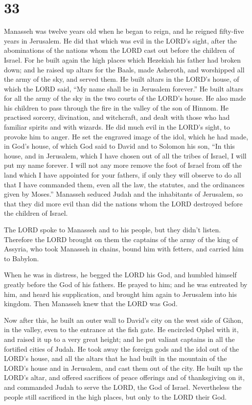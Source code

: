 \hypertarget{section-32}{%
\section{33}\label{section-32}}

 Manasseh was twelve years old when he began to reign, and
he reigned fifty-five years in Jerusalem.  He did that which
was evil in the LORD's sight, after the abominations of the nations whom
the LORD cast out before the children of Israel.  For he
built again the high places which Hezekiah his father had broken down;
and he raised up altars for the Baals, made Asheroth, and worshipped all
the army of the sky, and served them.  He built altars in
the LORD's house, of which the LORD said, ``My name shall be in
Jerusalem forever.''  He built altars for all the army of
the sky in the two courts of the LORD's house.  He also made
his children to pass through the fire in the valley of the son of
Hinnom. He practised sorcery, divination, and witchcraft, and dealt with
those who had familiar spirits and with wizards. He did much evil in the
LORD's sight, to provoke him to anger.  He set the engraved
image of the idol, which he had made, in God's house, of which God said
to David and to Solomon his son, ``In this house, and in Jerusalem,
which I have chosen out of all the tribes of Israel, I will put my name
forever.  I will not any more remove the foot of Israel from
off the land which I have appointed for your fathers, if only they will
observe to do all that I have commanded them, even all the law, the
statutes, and the ordinances given by Moses.''  Manasseh
seduced Judah and the inhabitants of Jerusalem, so that they did more
evil than did the nations whom the LORD destroyed before the children of
Israel.

 The LORD spoke to Manasseh and to his people, but they
didn't listen.  Therefore the LORD brought on them the
captains of the army of the king of Assyria, who took Manasseh in
chains, bound him with fetters, and carried him to Babylon.

 When he was in distress, he begged the LORD his God, and
humbled himself greatly before the God of his fathers.  He
prayed to him; and he was entreated by him, and heard his supplication,
and brought him again to Jerusalem into his kingdom. Then Manasseh knew
that the LORD was God.

 Now after this, he built an outer wall to David's city on
the west side of Gihon, in the valley, even to the entrance at the fish
gate. He encircled Ophel with it, and raised it up to a very great
height; and he put valiant captains in all the fortified cities of
Judah.  He took away the foreign gods and the idol out of
the LORD's house, and all the altars that he had built in the mountain
of the LORD's house and in Jerusalem, and cast them out of the city.
 He built up the LORD's altar, and offered sacrifices of
peace offerings and of thanksgiving on it, and commanded Judah to serve
the LORD, the God of Israel.  Nevertheless the people still
sacrificed in the high places, but only to the LORD their God.

